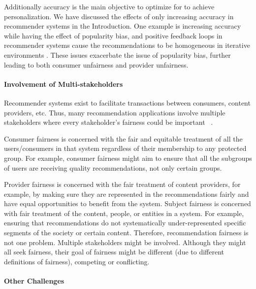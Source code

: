             Additionally accuracy is the main objective to optimize for to achieve personalization. We have discussed the effects of only increasing accuracy in recommender systems in the Introduction. One example is increasing accuracy while having the effect of popularity bias, and positive feedback loops in recommender systems cause the recommendations to be homogeneous in iterative environments \cite{Chaney2018}. These issues exacerbate the issue of popularity bias, further leading to both consumer unfairness and provider unfairness.

        \vspace{0.25cm}
        \noindent \paragraph{Involvement of Multi-stakeholders}
        \vspace{0.25cm}
        
            Recommender systems exist to facilitate transactions between consumers, content providers, etc. Thus, many recommendation applications involve multiple stakeholders where every stakeholder's fairness could be important ~\cite{burke_multisided_2017}.
            
            Consumer fairness is concerned with the fair and equitable treatment of all the users/consumers in that system regardless of their membership to any protected group. For example, consumer fairness might aim to ensure that all the subgroups of users are receiving quality recommendations, not only certain groups. 
            
            Provider fairness is concerned with the fair treatment of content providers, for example, by making sure they are represented in the recommendations fairly and have equal opportunities to benefit from the system. Subject fairness is concerned with fair treatment of the content, people, or entities in a system. For example, ensuring that recommendations do not systematically under-represented specific segments of the society or certain content. Therefore, recommendation fairness is not one problem. Multiple stakeholders might be involved. Although they might all seek fairness, their goal of fairness might be different (due to different definitions of fairness), competing or conflicting.
            
        \vspace{0.25cm}
        \noindent \paragraph{Other Challenges}
        \vspace{0.25cm}
        
